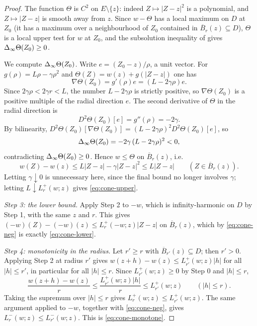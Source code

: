 \begin{proof}
The function $\Theta$ is $C^2$ on $E\setminus\{z\}$: indeed
$Z\mapsto|Z-z|^2$ is a polynomial, and $Z\mapsto|Z-z|$ is smooth away from $z$.
Since $w-\Theta$ has a local maximum on $D$ at $Z_0$ (it has a maximum over a
neighbourhood of $Z_0$ contained in $\overline B_r(z)\subseteq D$), $\Theta$ is a
local upper test for $w$ at $Z_0$, and the subsolution inequality of
 gives $\Delta_{\infty}\Theta(Z_0)\ge0$.

We compute $\Delta_{\infty}\Theta(Z_0)$. Write $e=(Z_0-z)/\rho$, a unit vector. For
$g(\rho)=L\rho-\gamma\rho^2$ and $\Theta(Z)=w(z)+g(|Z-z|)$ one has
\[
  \nabla\Theta(Z_0)=g'(\rho)e=(L-2\gamma\rho)e .
\]
Since $2\gamma\rho<2\gamma r<L$, the number $L-2\gamma\rho$ is strictly
positive, so $\nabla\Theta(Z_0)$ is a positive multiple of the radial direction
$e$. The second derivative of $\Theta$ in the radial direction is
\[
  D^2\Theta(Z_0)[e]=g''(\rho)=-2\gamma .
\]
By bilinearity, $D^2\Theta(Z_0)[\nabla\Theta(Z_0)]
 =(L-2\gamma\rho)^2D^2\Theta(Z_0)[e]$, so
\[
  \Delta_{\infty}\Theta(Z_0)=-2\gamma\,(L-2\gamma\rho)^2<0,
\]
contradicting $\Delta_{\infty}\Theta(Z_0)\ge0$. Hence $w\le\Theta$ on
$\overline B_r(z)$, i.e.
\[
  w(Z)-w(z)\le L|Z-z|-\gamma|Z-z|^2\le L|Z-z|
       \qquad(Z\in\overline B_r(z)).
\]
Letting $\gamma\downarrow0$ is unnecessary here, since the final bound no longer
involves $\gamma$; letting $L\downarrow L_r^+(w;z)$ gives
\eqref{eq:cone-upper}.

\emph{Step 3: the lower bound.}
Apply Step 2 to $-w$, which is infinity-harmonic on $D$ by Step 1, with the same
$z$ and $r$. This gives
$(-w)(Z)-(-w)(z)\le L_r^+(-w;z)|Z-z|$ on $\overline B_r(z)$, which by
\eqref{eq:cone-neg} is exactly \eqref{eq:cone-lower}.

\emph{Step 4: monotonicity in the radius.}
Let $r'\ge r$ with $\overline B_{r'}(z)\subseteq D$; then $r'>0$. Applying Step 2
at radius $r'$ gives $w(z+h)-w(z)\le L_{r'}^+(w;z)|h|$ for all $|h|\le r'$, in
particular for all $|h|\le r$. Since $L_{r'}^+(w;z)\ge0$ by Step 0 and
$|h|\le r$,
\[
  \frac{w(z+h)-w(z)}{r}\le\frac{L_{r'}^+(w;z)|h|}{r}
       \le L_{r'}^+(w;z)\qquad(|h|\le r).
\]
Taking the supremum over $|h|\le r$ gives $L_r^+(w;z)\le L_{r'}^+(w;z)$. The
same argument applied to $-w$, together with \eqref{eq:cone-neg}, gives
$L_r^-(w;z)\le L_{r'}^-(w;z)$. This is \eqref{eq:cone-monotone}.
\end{proof}
